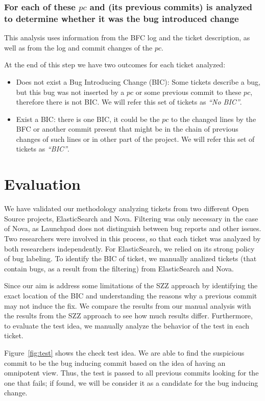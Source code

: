 \documentclass[conference]{IEEEtran}
\begin{document}
\subsubsection{For each of these $pc$ and (its previous commits) is analyzed to determine whether it was the bug introduced change }

This analysis uses information from the BFC log and the ticket description, as well as from the log and commit changes of the $pc$.

At the end of this step we have two outcomes for each ticket analyzed:
\begin{itemize}
	\item Does not exist a Bug Introducing Change (BIC): Some tickets describe a bug, but this bug was not inserted by a $pc$ or some previous commit to these $pc$, therefore there is not BIC. We will refer this set of tickets as \textit{``No BIC''}.
	\item Exist a BIC: there is one BIC, it could be the $pc$ to the changed lines by the BFC or another commit present that might be in the chain of previous changes of such lines or in other part of the project. We will refer this set of tickets as \textit{``BIC''}. 
\end{itemize}

\section{Evaluation} 
We have validated our methodology analyzing tickets from two different Open Source projects, ElasticSearch and Nova. Filtering was only necessary in the case of Nova, as Launchpad does not distinguish between bug reports and other issues. Two researchers were involved in this process, so that each ticket was analyzed by both researchers independently. For ElasticSearch, we relied on its strong policy of bug labeling. To identify the BIC of ticket, we manually analized tickets (that contain bugs, as a result from the filtering) from ElasticSearch and Nova.

Since our aim is address some limitations of the SZZ approach by identifying the exact location of the BIC and understanding the reasons why a previous commit may not induce the fix. We compare the results from our manual analysis with the results from the SZZ approach to see how much results differ. Furthermore, to evaluate the test idea, we manually analyze the behavior of the test in each ticket. 

Figure~\ref{fig:test} shows the check test idea. We are able to find the suspicious commit to be the bug inducing commit based on the idea of having an omnipotent view. Thus, the test is passed to all previous commits looking for the one that fails; if found, we will be consider it as a candidate for the bug inducing change.
\end{document}
